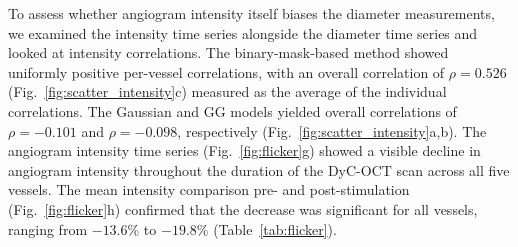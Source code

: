 \documentclass{optica-article}
\begin{document}
To assess whether angiogram intensity itself biases the diameter measurements, we examined the intensity time series alongside the diameter time series and looked at intensity correlations. The binary-mask-based method showed uniformly positive per-vessel correlations, with an overall correlation of $\rho = 0.526$ (Fig.~\ref{fig:scatter_intensity}c) measured as the average of the individual correlations. The Gaussian and GG models yielded overall correlations of $\rho = -0.101$ and $\rho = -0.098$, respectively (Fig.~\ref{fig:scatter_intensity}a,b). The angiogram intensity time series (Fig.~\ref{fig:flicker}g) showed a visible decline in angiogram intensity throughout the duration of the DyC-OCT scan across all five vessels. The mean intensity comparison pre- and post-stimulation (Fig.~\ref{fig:flicker}h) confirmed that the decrease was significant for all vessels, ranging from $-13.6\%$ to $-19.8\%$ (Table~\ref{tab:flicker}). 
\end{document}

